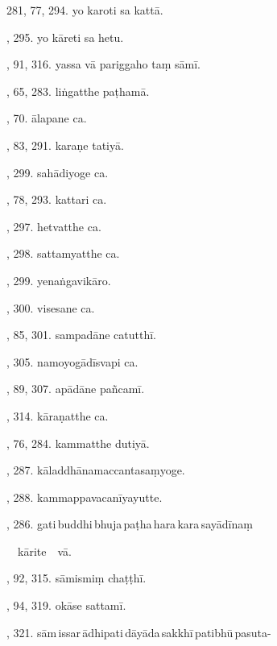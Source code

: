 281, 77, 294. yo karoti sa kattā.\hfill \pageref{sut:281}\par {}, 295. yo kāreti sa hetu.\hfill \pageref{sut:282}\par {}, 91, 316. yassa vā pariggaho taṃ sāmī.\hfill \pageref{sut:283}\par {}, 65, 283. liṅgatthe paṭhamā.\hfill \pageref{sut:284}\par {}, 70. ālapane ca.\hfill \pageref{sut:285}\par {}, 83, 291. karaṇe tatiyā.\hfill \pageref{sut:286}\par {}, 299. sahādiyoge ca.\hfill \pageref{sut:287}\par {}, 78, 293. kattari ca.\hfill \pageref{sut:288}\par {}, 297. hetvatthe ca.\hfill \pageref{sut:289}\par {}, 298. sattamyatthe ca.\hfill \pageref{sut:290}\par {}, 299. yenaṅgavikāro.\hfill \pageref{sut:291}\par {}, 300. visesane ca.\hfill \pageref{sut:292}\par {}, 85, 301. sampadāne catutthī.\hfill \pageref{sut:293}\par {}, 305. namoyogādīsvapi ca.\hfill \pageref{sut:294}\par {}, 89, 307. apādāne pañcamī.\hfill \pageref{sut:295}\par {}, 314. kāraṇatthe ca.\hfill \pageref{sut:296}\par {}, 76, 284. kammatthe dutiyā.\hfill \pageref{sut:297}\par {}, 287. kāladdhānamaccantasaṃyoge.\hfill \pageref{sut:298}\par {}, 288. kammappavacanīyayutte.\hfill \pageref{sut:299}\par {}, 286. gati\,buddhi\,bhuja\,paṭha\,hara\,kara\,sayādīnaṃ\par \noindent
\hspace{15mm}\ \ kārite\ \ vā.\hfill \pageref{sut:300}\par {}, 92, 315. sāmismiṃ chaṭṭhī.\hfill \pageref{sut:301}\par {}, 94, 319. okāse sattamī.\hfill \pageref{sut:302}\par {}, 321. sām\,issar\,ādhipati\,dāyāda\,sakkhī\,patibhū\,pasuta-\par \noindent
